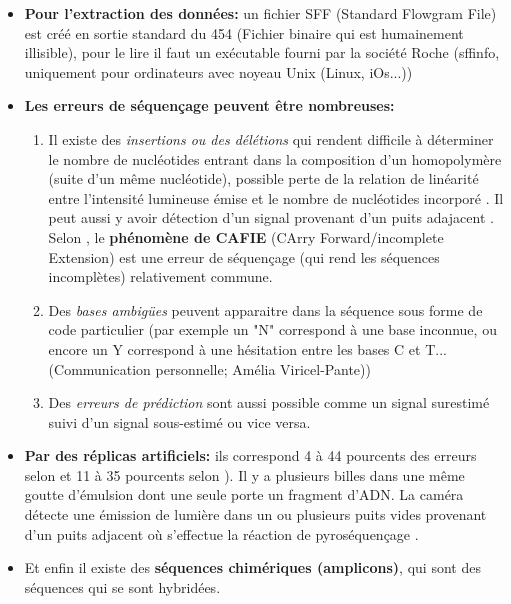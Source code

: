 \documentclass[a4paper,11pt,twoside]{report}
\begin{document}
\begin{itemize}
\item \textbf{Pour l'extraction des données:} un fichier SFF (Standard Flowgram File) est créé en sortie standard du 454 (Fichier binaire qui est humainement illisible\citep{Peyretaillade2010}), pour le lire il faut un exécutable fourni par la société Roche (sffinfo, uniquement pour ordinateurs avec noyeau Unix (Linux, iOs...))
\item \textbf{Les erreurs de séquençage peuvent être nombreuses:} 

\begin{enumerate}
	\item Il existe des {\itshape insertions ou des délétions} qui rendent difficile à déterminer le nombre de nucléotides entrant dans la composition d'un homopolymère (suite d'un même nucléotide), possible perte de la relation de linéarité entre l'intensité lumineuse émise et le nombre de nucléotides incorporé \citep{Peyretaillade2010}. Il peut aussi y avoir détection d'un signal provenant d'un puits adajacent \citep{Peyretaillade2010}. Selon \citep{balzer2011systematic}, le \textbf{phénomène de CAFIE} (CArry Forward/incomplete Extension) est une erreur de séquençage (qui rend les séquences incomplètes) relativement commune.
	\item Des {\itshape bases ambigües} peuvent apparaitre dans la séquence sous forme de code particulier (par exemple un "N" correspond à une base inconnue, ou encore un Y correspond à une hésitation entre les bases C et T...(Communication personnelle; Amélia Viricel-Pante)) 
	\item Des {\itshape erreurs de prédiction} sont aussi possible comme un signal surestimé suivi d'un signal sous-estimé ou vice versa. \citep{gilles2011accuracy}
	\end{enumerate}

\item \textbf{Par des réplicas artificiels:} ils correspond 4 à 44 pourcents des erreurs selon \citep{niu2010artificial} et 11 à 35 pourcents selon \citep{gomez2009systematic}). Il y a plusieurs billes dans une même goutte d’émulsion dont une seule porte un fragment d’ADN. La caméra détecte une émission de lumière dans un ou plusieurs puits vides provenant d’un puits adjacent où s’effectue la réaction de pyroséquençage \citep{Peyretaillade2010}.
\item Et enfin il existe des \textbf{séquences chimériques (amplicons)}, qui sont des séquences qui se sont hybridées\citep{haas2011chimeric}.
\end{itemize}
\end{document}
